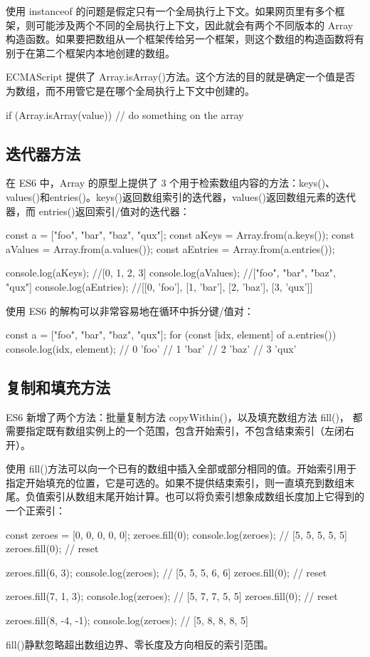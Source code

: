 使用 instanceof 的问题是假定只有一个全局执行上下文。如果网页里有多个框架，则可能涉及两个不同的全局执行上下文，因此就会有两个不同版本的 Array 构造函数。如果要把数组从一个框架传给另一个框架，则这个数组的构造函数将有别于在第二个框架内本地创建的数组。

ECMAScript 提供了 Array.isArray()方法。这个方法的目的就是确定一个值是否为数组，而不用管它是在哪个全局执行上下文中创建的。
\begin{js}
if (Array.isArray(value)) {
    // do something on the array
    }
\end{js}

\subsection{迭代器方法}
在 ES6 中，Array 的原型上提供了 3 个用于检索数组内容的方法：keys()、values()和entries()。keys()返回数组索引的迭代器，values()返回数组元素的迭代器，而 entries()返回索引/值对的迭代器：
\begin{js}
const a = ["foo", "bar", "baz", "qux"];
const aKeys = Array.from(a.keys());
const aValues = Array.from(a.values());
const aEntries = Array.from(a.entries());

console.log(aKeys); //[0, 1, 2, 3]
console.log(aValues); //["foo", "bar", "baz", "qux"]
console.log(aEntries); //[[0, 'foo'], [1, 'bar'], [2, 'baz'], [3, 'qux']]
\end{js}

使用 ES6 的解构可以非常容易地在循环中拆分键/值对：
\begin{js}
const a = ["foo", "bar", "baz", "qux"];
for (const [idx, element] of a.entries()) {
    console.log(idx, element);
}
// 0 'foo'
// 1 'bar'
// 2 'baz'
// 3 'qux'
\end{js}
\subsection{复制和填充方法}
ES6 新增了两个方法：批量复制方法 copyWithin()，以及填充数组方法 fill()， 都需要指定既有数组实例上的一个范围，包含开始索引，不包含结束索引（左闭右开）。

使用 fill()方法可以向一个已有的数组中插入全部或部分相同的值。开始索引用于指定开始填充的位置，它是可选的。如果不提供结束索引，则一直填充到数组末尾。负值索引从数组末尾开始计算。也可以将负索引想象成数组长度加上它得到的一个正索引：

\begin{js}
const zeroes = [0, 0, 0, 0, 0];
zeroes.fill(0);
console.log(zeroes); // [5, 5, 5, 5, 5]
zeroes.fill(0); // reset

zeroes.fill(6, 3);
console.log(zeroes); // [5, 5, 5, 6, 6]
zeroes.fill(0); // reset

zeroes.fill(7, 1, 3);
console.log(zeroes); // [5, 7, 7, 5, 5]
zeroes.fill(0); // reset

zeroes.fill(8, -4, -1);
console.log(zeroes); // [5, 8, 8, 8, 5]
\end{js}
fill()静默忽略超出数组边界、零长度及方向相反的索引范围。

